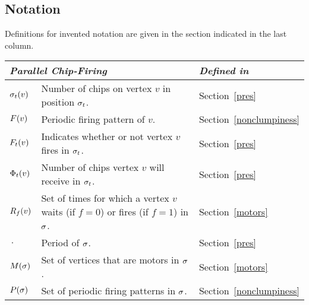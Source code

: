 \subsection*{Notation}
\newlength{\tablespace}
\setlength{\tablespace}{.3\baselineskip}
Definitions for invented notation are given in the section indicated in the
last column.

\showgame
\begin{centering}
  \begin{longtable}{l p{} l}
    \toprule
    \multicolumn{2}{l}{\emph{Parallel Chip-Firing}} & \emph{Defined in} \\
    \midrule

    $\chips{v}{t}$ & Number of chips on vertex $v$ in position $\pos{t}$. &
    Section~\ref{pres} \vspace{\tablespace}\\

    $\pfp{v}$ & Periodic firing pattern of $v$. & Section~\ref{nonclumpiness}
    \vspace{\tablespace}\\

    $\firing{v}{t}$ & Indicates whether or not vertex $v$ fires in $\pos{t}$. &
    Section~\ref{pres} \vspace{\tablespace}\\

    $\receiving{v}{t}$ & Number of chips vertex $v$ will receive in $\pos{t}$.
    & Section~\ref{pres} \vspace{\tablespace}\\

    $\pat{v}{f}$ & Set of times for which a vertex $v$ waits (if $f = 0$) or
    fires (if $f = 1$) in $\s$. & Section~\ref{motors} \vspace{\tablespace}\\

    $\period$ & Period of $\s$. & Section~\ref{pres} \vspace{\tablespace}\\

    $\mots$ & Set of vertices that are motors in $\s$. & Section~\ref{motors}
    \vspace{\tablespace}\\

    $\pfps$ & Set of periodic firing patterns in $\s$. &
    Section~\ref{nonclumpiness} \vspace{\tablespace}\\


\end{longtable}
\end{centering}
